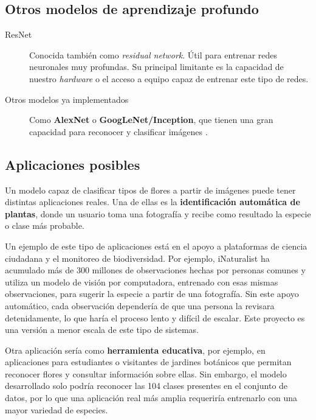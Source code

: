 \subsection{Otros modelos de aprendizaje profundo}
\begin{description}
    \item[ResNet] Conocida también como \textit{residual network}. Útil para entrenar redes neuronales muy profundas. Su principal limitante es la capacidad de nuestro \textit{hardware} o el acceso a equipo capaz de entrenar este tipo de redes.
    \item[Otros modelos ya implementados] Como \textbf{AlexNet} o \textbf{GoogLeNet/Inception}, que tienen una gran capacidad para reconocer y clasificar imágenes \parencite{ibmWhatImage}.
\end{description}

\subsection{Aplicaciones posibles}
Un modelo capaz de clasificar tipos de flores a partir de imágenes puede tener distintas aplicaciones reales. Una de ellas es la \textbf{identificación automática de plantas}, donde un usuario toma una fotografía y recibe como resultado la especie o clase más probable.

Un ejemplo de este tipo de aplicaciones está en el apoyo a plataformas de ciencia ciudadana y el monitoreo de biodiversidad. Por ejemplo, iNaturalist ha acumulado más de 300 millones de observaciones hechas por personas comunes \parencite{inaturalist} y utiliza un modelo de visión por computadora, entrenado con esas mismas observaciones, para sugerir la especie a partir de una fotografía. Sin este apoyo automático, cada observación dependería de que una persona la revisara detenidamente, lo que haría el proceso lento y difícil de escalar. Este proyecto es una versión a menor escala de este tipo de sistemas.

Otra aplicación sería como \textbf{herramienta educativa}, por ejemplo, en aplicaciones para estudiantes o visitantes de jardines botánicos que permitan reconocer flores y consultar información sobre ellas. Sin embargo, el modelo desarrollado solo podría reconocer las 104 clases presentes en el conjunto de datos, por lo que una aplicación real más amplia requeriría entrenarlo con una mayor variedad de especies.
